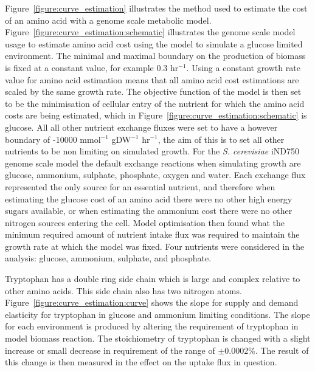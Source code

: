 Figure~\vref{figure:curve_estimation} illustrates the method used to estimate the cost of an amino acid with a genome scale metabolic model. Figure~\ref{figure:curve_estimation:schematic} illustrates the genome scale model usage to estimate amino acid cost using the model to simulate a glucose limited environment. The minimal and maximal boundary on the production of biomass is fixed at a constant value, for example 0.3 hr$^{-1}$. Using a constant growth rate value for amino acid estimation means that all amino acid cost estimations are scaled by the same growth rate. The objective function of the model is then set to be the minimisation of cellular entry of the nutrient for which the amino acid costs are being estimated, which in Figure~\ref{figure:curve_estimation:schematic} is glucose. All all other nutrient exchange fluxes were set to have a however boundary of -10000 mmol$^{-1}$ gDW$^{-1}$ hr$^{-1}$, the aim of this is to set all other nutrients to be non limiting on simulated growth. For the \emph{S. cerevisiae} iND750 \cite{duarte2004a} genome scale model the default exchange reactions when simulating growth are glucose, ammonium, sulphate, phosphate, oxygen and water. Each exchange flux represented the only source for an essential nutrient, and therefore when estimating the glucose cost of an amino acid there were no other high energy sugars available, or when estimating the ammonium cost there were no other nitrogen sources entering the cell. Model optimisation then found what the minimum required amount of nutrient intake flux was required to maintain the growth rate at which the model was fixed. Four nutrients were considered in the analysis: glucose, ammonium, sulphate, and phosphate.

Tryptophan has a double ring side chain which is large and complex relative to other amino acids. This side chain also has two nitrogen atoms. Figure~\ref{figure:curve_estimation:curve} shows the slope for supply and demand elasticity for tryptophan in glucose and ammonium limiting conditions. The slope for each environment is produced by altering the requirement of tryptophan in model biomass reaction. The stoichiometry of tryptophan is changed with a slight increase or small decrease in requirement of the range of $\pm$0.0002\%. The result of this change is then measured in the effect on the uptake flux in question. 


